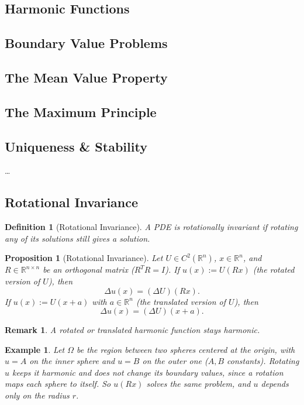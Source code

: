 \documentclass{article}
\newtheorem{definition}{Definition}
\newtheorem*{example}{Example}
\newtheorem{remark}{Remark}
\newtheorem{proposition}{Proposition}
\newcommand{\R}{\mathbb{R}}
\begin{document}
\subsection{Harmonic Functions}

\subsection{Boundary Value Problems}

\subsection{The Mean Value Property}

\subsection{The Maximum Principle}

\subsection{Uniqueness \& Stability}

\dots
\subsection{Rotational Invariance}
\begin{definition}[Rotational Invariance]
    A PDE is rotationally invariant if rotating any of its solutions still gives a solution.
\end{definition}
\begin{proposition}[Rotational Invariance]
    Let $U \in C^2(\R^n)$, $x \in \R^n$, and $R\in\R^{n\times n}$ be an orthogonal matrix ($R^TR = I$). If $u(x) := U(Rx)$ (the rotated version of $U$), then
    \begin{equation}
        \Delta u(x) = (\Delta U)(Rx).
    \end{equation}
    If $u(x) := U(x+a)$ with $a\in\R^n$ (the translated version of $U$), then
    \begin{equation}
        \Delta u(x) = (\Delta U)(x+a).
    \end{equation}
\end{proposition}
\begin{remark}
    A rotated or translated harmonic function stays harmonic.
\end{remark}
\begin{example}
    Let $\Omega$ be the region between two spheres centered at the origin, with $u = A$ on the inner sphere and $u = B$ on the outer one ($A, B$ constants). Rotating $u$ keeps it harmonic and does not change its boundary values, since a rotation maps each sphere to itself. So $u(Rx)$ solves the same problem, and $u$ depends only on the radius $r$.
\end{example}
\end{document}
